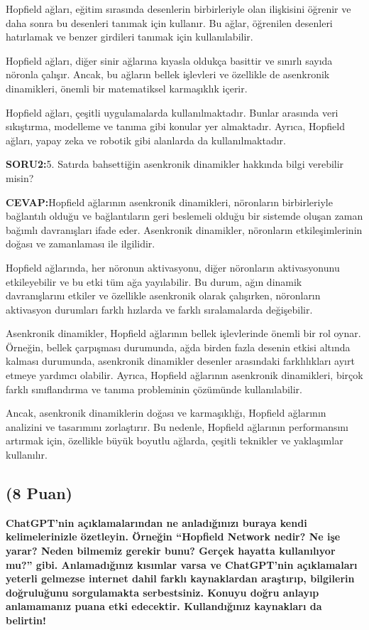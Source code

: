 \documentclass[11pt]{article}
\begin{document}
Hopfield ağları, eğitim sırasında desenlerin birbirleriyle olan ilişkisini öğrenir ve daha sonra bu desenleri tanımak için kullanır. Bu ağlar, öğrenilen desenleri hatırlamak ve benzer girdileri tanımak için kullanılabilir.

Hopfield ağları, diğer sinir ağlarına kıyasla oldukça basittir ve sınırlı sayıda nöronla çalışır. Ancak, bu ağların bellek işlevleri ve özellikle de asenkronik dinamikleri, önemli bir matematiksel karmaşıklık içerir.

Hopfield ağları, çeşitli uygulamalarda kullanılmaktadır. Bunlar arasında veri sıkıştırma, modelleme ve tanıma gibi konular yer almaktadır. Ayrıca, Hopfield ağları, yapay zeka ve robotik gibi alanlarda da kullanılmaktadır.

\textbf{SORU2:}5. Satırda bahsettiğin asenkronik dinamikler hakkında bilgi verebilir misin?

\textbf{CEVAP:}Hopfield ağlarının asenkronik dinamikleri, nöronların birbirleriyle bağlantılı olduğu ve bağlantıların geri beslemeli olduğu bir sistemde oluşan zaman bağımlı davranışları ifade eder. Asenkronik dinamikler, nöronların etkileşimlerinin doğası ve zamanlaması ile ilgilidir.

Hopfield ağlarında, her nöronun aktivasyonu, diğer nöronların aktivasyonunu etkileyebilir ve bu etki tüm ağa yayılabilir. Bu durum, ağın dinamik davranışlarını etkiler ve özellikle asenkronik olarak çalışırken, nöronların aktivasyon durumları farklı hızlarda ve farklı sıralamalarda değişebilir.

Asenkronik dinamikler, Hopfield ağlarının bellek işlevlerinde önemli bir rol oynar. Örneğin, bellek çarpışması durumunda, ağda birden fazla desenin etkisi altında kalması durumunda, asenkronik dinamikler desenler arasındaki farklılıkları ayırt etmeye yardımcı olabilir. Ayrıca, Hopfield ağlarının asenkronik dinamikleri, birçok farklı sınıflandırma ve tanıma probleminin çözümünde kullanılabilir.

Ancak, asenkronik dinamiklerin doğası ve karmaşıklığı, Hopfield ağlarının analizini ve tasarımını zorlaştırır. Bu nedenle, Hopfield ağlarının performansını artırmak için, özellikle büyük boyutlu ağlarda, çeşitli teknikler ve yaklaşımlar kullanılır.


\subsection{(8 Puan)} \textbf{ChatGPT’nin açıklamalarından ne anladığınızı buraya kendi kelimelerinizle özetleyin. Örneğin ``Hopfield Network nedir? Ne işe yarar? Neden bilmemiz gerekir bunu? Gerçek hayatta kullanılıyor mu?'' gibi. Anlamadığınız kısımlar varsa ve ChatGPT’nin açıklamaları yeterli gelmezse internet dahil farklı kaynaklardan araştırıp, bilgilerin doğruluğunu sorgulamakta serbestsiniz. Konuyu doğru anlayıp anlamamanız puana etki edecektir. Kullandığınız kaynakları da belirtin!}
\end{document}
